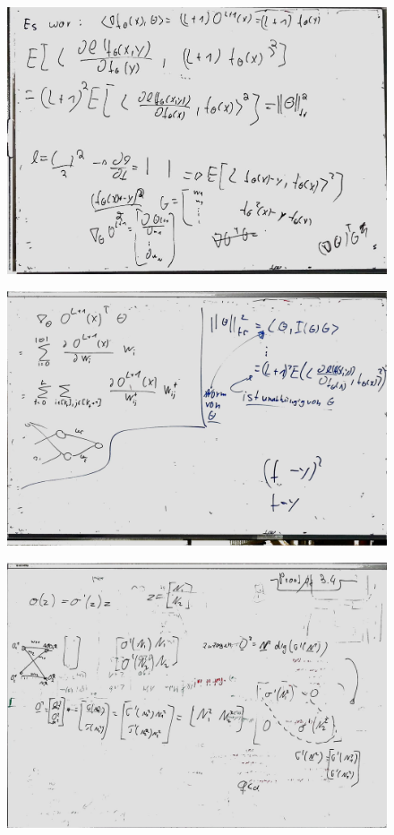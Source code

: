 \documentclass[a4paper]{article}
\begin{document}
\begin{figure}
	\centering
\includegraphics[width=\textwidth]{whiteboard_notes/07.jpg}
\end{figure}
\begin{figure}
	\centering
\includegraphics[width=\textwidth]{whiteboard_notes/08.jpg}
\end{figure}

\begin{figure}
	\centering
	\includegraphics[width=\textwidth]{whiteboard_notes/09.jpg}
\end{figure}
\end{document}
